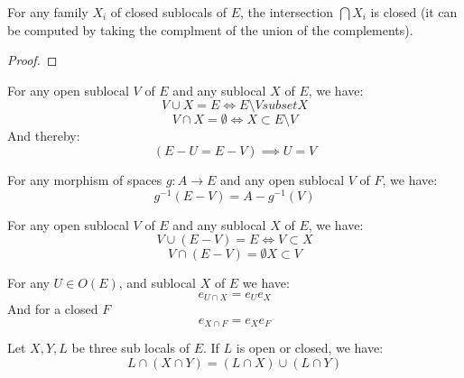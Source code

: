 \begin{lemma}
    \label{lem:closed_intersection}
    \leanok
    For any family $X_i$ of closed sublocals of $E$, the intersection $\bigcap X_i$ is closed (it can be computed by
    taking the complment of the union of the complements).
\end{lemma}
\begin{proof}
    \leanok
\end{proof}


\begin{lemma}
    \label{lem:properties_of_complements}
    For any open sublocal $V$ of $E$ and any sublocal $X$ of $E$, we have:
    \[V \cup X = E \iff E \setminus V subset X\]
    \[V \cap X = \emptyset \iff X \subset E \setminus V\]
    And thereby:
    \[(E - U = E - V) \implies U = V\]
\end{lemma}

\begin{lemma}
    \label{lem:preimage_of_complements}
    For any morphism of spaces $g: A \to E$ and any open sublocal $V$ of $F$, we have:
    \[g^{-1}(E - V) = A - g^{-1}(V)\]
\end{lemma}

\begin{lemma}
    \label{lem:properties_of_complements_part_2}
    For any open sublocal $V$ of $E$ and any sublocal $X$ of $E$, we have:
    \[V \cup (E - V) = E \iff V \subset X \]
    \[V \cap (E - V) = \emptyset X \subset V\]
\end{lemma}


\begin{lemma}
    \label{lem:open_closed_intersection}
    For any $U \in O(E)$, and sublocal $X$ of $E$ we have:
    \[e_{U \cap X} = e_Ue_X\]
    And for a closed $F$
    \[e_{X \cap F} = e_Xe_F\]
\end{lemma}

\begin{lemma}
    \label{lem:distribution_of_intersections_over_unions}
    Let $X, Y, L$ be three sub locals of $E$. If $L$ is open or closed, we have:
    \[L \cap (X \cap Y) = (L \cap X) \cup (L \cap Y)\]
\end{lemma}

